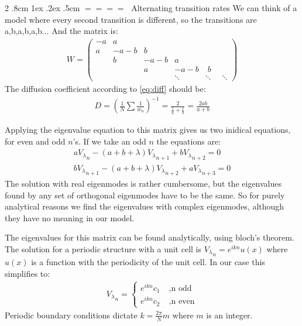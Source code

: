 \documentclass[onecolumn,fleqn,notitlepage,secnumarabic]{revtex4}
\makeatletter
\def\subsection{%
  \@startsection
    {subsection}%
    {2}%
    {\z@}%
    {.8cm \@plus1ex \@minus .2ex}%
    {.5cm}%
    {\normalfont\small\bfseries$=\!=\!=\!=\;$}%
}%
\makeatother
\begin{document}
\subsection{Alternating transition rates}
We can think of a model where every second transition is different, so the transitions are a,b,a,b,a,b... And the matrix is:
\begin{align}
W = 
\begin{pmatrix}
-a  & a \\
a  & -a-b &  b \\
 & b & -a-b &  a \\
& & a & -a-b & \; b \\
& & & \ddots &\ddots&\;\;\ddots
\end{pmatrix}
\end{align}
The diffusion coefficient according to \ref{eq:diff} should be:
\begin{align}\label{eq:D_alter}
D = \left(\frac{1}{N}\sum\frac{1}{w_n}\right)^{-1} = \frac{2}{\frac{1}{a} + \frac{1}{b}} = \frac{2ab}{a+b}
\end{align}

Applying the eigenvalue equation to this matrix gives us two inidical equations, for even and odd $n$'s. If we take an odd $n$ the equations are:
\begin{align}
a {V_\lambda}_n - (a+b+\lambda){V_\lambda}_{n+1} + b {V_\lambda}_{n+2} =0  \\
b {V_\lambda}_{n+1} - (a+b+\lambda){V_\lambda}_{n+2} + a {V_\lambda}_{n+3} =0 
\end{align}
The solution with real eigenmodes is rather cumbersome, but the eigenvalues found by any set of orthogonal eigenmodes have to be the same. So for purely analytical reasons we find the eigenvalues with complex eigenmodes, although they have no meaning in our model.


The eigenvalues for this matrix can be found analytically, using bloch's theorem. The solution for a periodic structure with a unit cell is ${V_\lambda}_n = e^{ikn} u(x)$ where $u(x)$ is a function with the periodicity of the unit cell. In our case this simplifies to:
\begin{align}
{V_\lambda}_n = \begin{cases}e^{ikn} c_1 \; &, \text{n odd} \\ e^{ikn} c_2 \; &, \text{n even} \end{cases}
\end{align}
Periodic boundary conditions dictate $k=\frac{2\pi}{N}m$ where $m$ is an integer.
\end{document}
